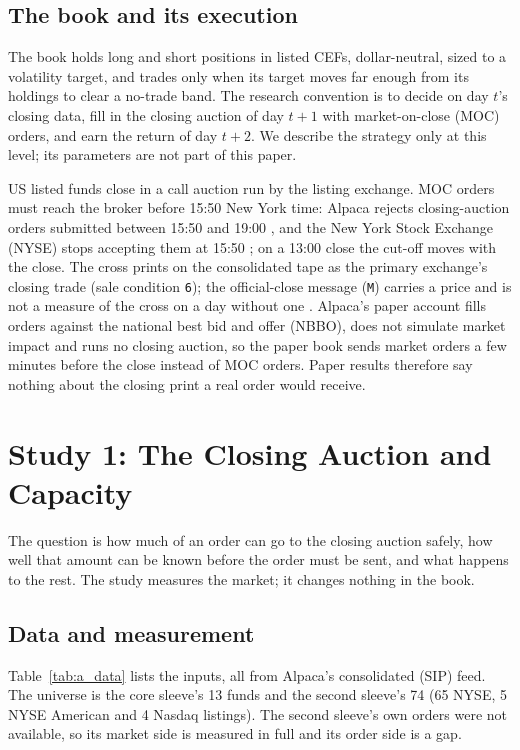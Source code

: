 \documentclass[10pt, a4paper, twocolumn]{article}
\begin{document}
\subsection{The book and its execution}

The book holds long and short positions in listed CEFs, dollar-neutral, sized to a volatility target, and trades only when its target moves far enough from its holdings to clear a no-trade band. The research convention is to decide on day $t$'s closing data, fill in the closing auction of day $t+1$ with market-on-close (MOC) orders, and earn the return of day $t+2$. We describe the strategy only at this level; its parameters are not part of this paper.

US listed funds close in a call auction run by the listing exchange. MOC orders must reach the broker before 15:50 New York time: Alpaca rejects closing-auction orders submitted between 15:50 and 19:00 \cite{alpacaorders}, and the New York Stock Exchange (NYSE) stops accepting them at 15:50 \cite{nyseauctions}; on a 13:00 close the cut-off moves with the close. The cross prints on the consolidated tape as the primary exchange's closing trade (sale condition \texttt{6}); the official-close message (\texttt{M}) carries a price and is not a measure of the cross on a day without one \cite{ctsspec}. Alpaca's paper account fills orders against the national best bid and offer (NBBO), does not simulate market impact \cite{alpacapaper} and runs no closing auction, so the paper book sends market orders a few minutes before the close instead of MOC orders. Paper results therefore say nothing about the closing print a real order would receive.

\section{Study 1: The Closing Auction and Capacity}
\label{sec:auction}

The question is how much of an order can go to the closing auction safely, how well that amount can be known before the order must be sent, and what happens to the rest. The study measures the market; it changes nothing in the book.

\subsection{Data and measurement}

Table~\ref{tab:a_data} lists the inputs, all from Alpaca's consolidated (SIP) feed. The universe is the core sleeve's 13 funds and the second sleeve's 74 (65 NYSE, 5 NYSE American and 4 Nasdaq listings). The second sleeve's own orders were not available, so its market side is measured in full and its order side is a gap.
\end{document}
